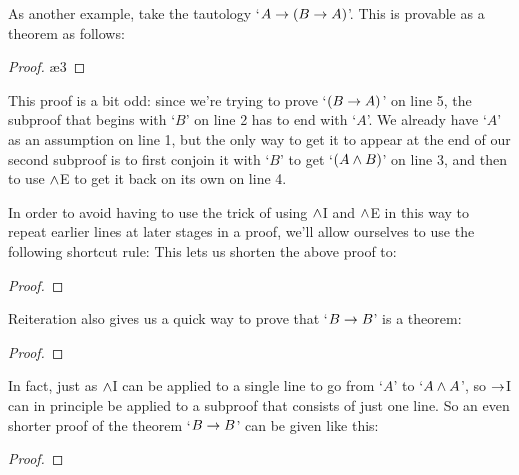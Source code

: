 As another example, take the tautology `$A \rightarrow (B \rightarrow A)$'.  This is provable as a theorem as follows:\\
\begin{proof}
\open
{}  
\open
{}  
 
 \ae{3}
\close
{} 
\close
{} 
\end{proof}
\noindent This proof is a bit odd: since we're trying to prove `$(B \rightarrow A)$' on line 5, the subproof that begins with `$B$' on line 2 has to end with `$A$'.  We already have `$A$' as an assumption on line 1, but the only way to get it to appear at the end of our second subproof is to first conjoin it with `$B$' to get `$(A \wedge B)$' on line 3, and then to use $\wedge$E to get it back on its own on line 4.

In order to avoid having to use the trick of using $\wedge$I and $\wedge$E in this way to repeat earlier lines at later stages in a proof, we'll allow ourselves to use the following shortcut rule:
This lets us shorten the above proof to:\\

\begin{proof}
\open
{} 
\open
{}  
 
\close
{} 
\close
{} 
\end{proof}

\noindent Reiteration also gives us a quick way to prove that `$B \rightarrow B$' is a theorem:\\

\begin{proof}
\open
{} 
 
\close
{} 
\end{proof}

In fact, just as $\wedge$I can be applied to a single line to go from `$A$' to `$A \wedge A$', so $\rightarrow$I can in principle be applied to a subproof that consists of just one line.  So an even shorter proof of  the theorem `$B \rightarrow B$' can be given like this:\\

\begin{proof}
\open
{} 
\close
{} 
\end{proof}

